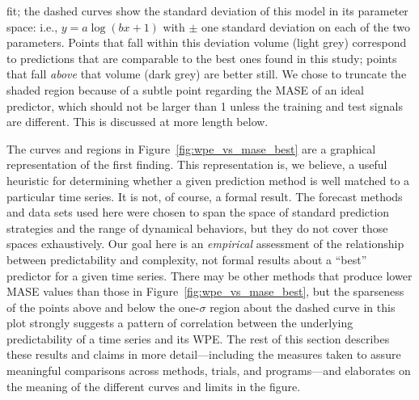 fit; the dashed curves show the standard deviation of this model in
its parameter space: i.e., $y = a \log(b x + 1)$ with $\pm$ one
standard deviation on each of the two parameters.  Points that fall
within this deviation volume (light grey) correspond to predictions
that are comparable to the best ones found in this study; points that
fall \emph{above} that volume (dark grey) are better still.  We chose
to truncate the shaded region because of a subtle point regarding the
MASE of an ideal predictor, which should not be larger than 1 unless
the training and test signals are different.  This is discussed at
more length below.

The curves and regions in Figure~\ref{fig:wpe_vs_mase_best} are a
graphical representation of the first finding.  This representation
is, we believe, a useful heuristic for determining whether a given
prediction method is well matched to a particular time series.  It is
not, of course, a formal result.  The forecast methods and data sets
used here were chosen to span the space of standard prediction
strategies and the range of dynamical behaviors, but they do not cover
those spaces exhaustively.  Our goal here is an \emph{empirical}
assessment of the relationship between predictability and complexity,
not formal results about a ``best'' predictor for a given time series.
There may be other methods that produce lower MASE values than those
in Figure~\ref{fig:wpe_vs_mase_best}, but the sparseness of the points
above and below the one-$\sigma$ region about the dashed curve in this
plot strongly suggests a pattern of correlation between the underlying
predictability of a time series and its WPE.  The rest of this section
describes these results and claims in more detail---including the
measures taken to assure meaningful comparisons across methods,
trials, and programs---and elaborates on the meaning of the different
curves and limits in the figure.


